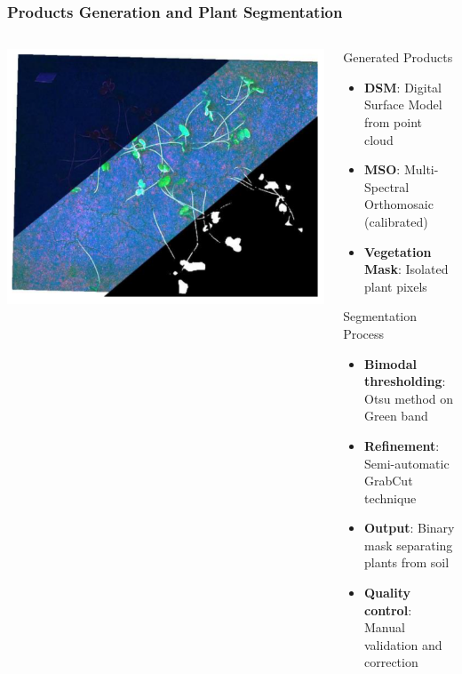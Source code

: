\documentclass[aspectratio=43]{beamer}
\begin{document}
\begin{frame}
    \frametitle{Products Generation and Plant Segmentation}
    
    \begin{columns}
        \begin{column}{0.5\textwidth}
            \includegraphics[width=\textwidth]{Imgs/agronomy-14-00306-g006.png}
        \end{column}
        
        \begin{column}{0.5\textwidth}
            \begin{block}{Generated Products}
                \scriptsize
                \begin{itemize}
                    \item \textbf{DSM}: Digital Surface Model from point cloud
                    \item \textbf{MSO}: Multi-Spectral Orthomosaic (calibrated)
                    \item \textbf{Vegetation Mask}: Isolated plant pixels
                \end{itemize}
            \end{block}
            
            \begin{exampleblock}{Segmentation Process}
                \scriptsize
                \begin{itemize}
                    \item \textbf{Bimodal thresholding}: Otsu method on Green band
                    \item \textbf{Refinement}: Semi-automatic GrabCut technique
                    \item \textbf{Output}: Binary mask separating plants from soil
                    \item \textbf{Quality control}: Manual validation and correction
                \end{itemize}
            \end{exampleblock}
        \end{column}
    \end{columns}
\end{frame}
\end{document}
